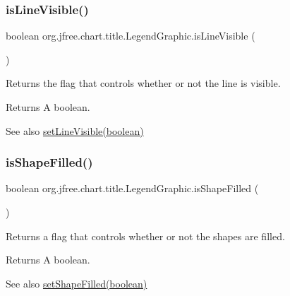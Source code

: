 \subsubsection{\texorpdfstring{is\+Line\+Visible()}{isLineVisible()}}
{\footnotesize\ttfamily boolean org.\+jfree.\+chart.\+title.\+Legend\+Graphic.\+is\+Line\+Visible (\begin{DoxyParamCaption}{ }\end{DoxyParamCaption})}

Returns the flag that controls whether or not the line is visible.

\begin{DoxyReturn}{Returns}
A boolean.
\end{DoxyReturn}
\begin{DoxySeeAlso}{See also}
\mbox{\hyperlink{classorg_1_1jfree_1_1chart_1_1title_1_1_legend_graphic_a5723644cc122bf1a69c802c973201dca}{set\+Line\+Visible(boolean)}} 
\end{DoxySeeAlso}
\mbox{\label{classorg_1_1jfree_1_1chart_1_1title_1_1_legend_graphic_a7412e8640137319e0b3e1ec86d51170a}} 
\subsubsection{\texorpdfstring{is\+Shape\+Filled()}{isShapeFilled()}}
{\footnotesize\ttfamily boolean org.\+jfree.\+chart.\+title.\+Legend\+Graphic.\+is\+Shape\+Filled (\begin{DoxyParamCaption}{ }\end{DoxyParamCaption})}

Returns a flag that controls whether or not the shapes are filled.

\begin{DoxyReturn}{Returns}
A boolean.
\end{DoxyReturn}
\begin{DoxySeeAlso}{See also}
\mbox{\hyperlink{classorg_1_1jfree_1_1chart_1_1title_1_1_legend_graphic_ae11a7c5618cce84ce2e0614a1c033572}{set\+Shape\+Filled(boolean)}} 
\end{DoxySeeAlso}
\mbox{\label{classorg_1_1jfree_1_1chart_1_1title_1_1_legend_graphic_afb3dad5bedac047e7a37b67ff0778322}} 
